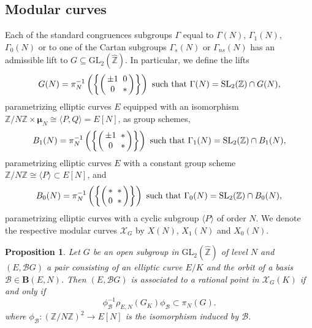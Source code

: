 \documentclass{amsart}
\newcommand{\cB}{\mathcal{B}}
\newcommand{\BB}{\mathbf{B}}
\newcommand{\cX}{\mathcal{X}}
\newcommand{\ZZ}{\mathbb{Z}}
\newcommand{\ZZhat}{\widehat{\ZZ}}
\newcommand{\XC}{\mathcal{X}}
\newcommand{\GL}{\mathrm{GL}}
\newcommand{\SL}{\mathrm{SL}}
\newcommand{\isom}{\cong}
\newcommand{\Group}{G}
\newcommand{\mmu}{\boldsymbol{\mu}}
\newtheorem{proposition}[theorem]{Proposition}
\begin{document}
\subsection*{Modular curves}
\mbox{}
Each of the standard congruences subgroups $\Gamma$ equal to $\Gamma(N)$, $\Gamma_1(N)$, $\Gamma_0(N)$
or to one of the Cartan subgroups $\Gamma_s(N)$ or $\Gamma_{ns}(N)$ has an admissible lift to
$G \subseteq \GL_2(\ZZhat)$.  In particular, we define the lifts
$$
G(N)   = \pi_N^{-1}\left(\left\{\left(\begin{array}{@{\,}c@{\;\;}c@{\,}} \pm1 & 0 \\ 0 & {*} \end{array}\right)\right\}\right)
\mbox{ such that } \Gamma(N) = \SL_2(\ZZ) \cap G(N),
$$
parametrizing elliptic curves $E$ equipped with an isomorphism $\ZZ/N\ZZ \times \mmu_N \isom
\langle{P,Q}\rangle = E[N]$, as group schemes,
$$
B_1(N) = \pi_N^{-1}\left(\left\{\left(\begin{array}{@{\,}c@{\;\;}c@{\,}} \pm1 & {*} \\ 0 & {*} \end{array}\right)\right\}\right)
\mbox{ such that } \Gamma_1(N) = \SL_2(\ZZ) \cap B_1(N),
$$
parametrizing elliptic curves $E$ with a constant group scheme $\ZZ/N\ZZ \isom \langle{P}\rangle \subset E[N]$, and
$$
B_0(N) = \pi_N^{-1}\left(\left\{\left(\begin{array}{@{\,}c@{\;\;}c@{\,}} {*} & {*} \\ 0 & {*} \end{array}\right)\right\}\right)
\mbox{ such that } \Gamma_0(N) = \SL_2(\ZZ) \cap B_0(N),
$$
parametrizing elliptic curves with a cyclic subgroup $\langle{P}\rangle$ of order $N$.
We denote the respective modular curves $\XC_G$ by $X(N)$, $X_1(N)$ and $X_0(N)$.

\begin{proposition}
  Let $\Group$ be an open subgroup in $\GL_2(\ZZhat)$ of level $N$ and
  $(E,\cB\Group)$ a pair consisting of an elliptic curve $E/K$ and the
  orbit of a basis $\cB \in \BB(E,N)$.
  Then $(E,\cB\Group)$ is associated to a rational point
  in $\cX_G(K)$ if and only if
  $$
  \phi_\cB^{-1}\rho_{E,N}(G_K)\phi_\cB \subset \pi_N(G).
  $$
  where $\phi_\cB: (\ZZ/N\ZZ)^2 \to E[N]$ is the isomorphism induced by $\cB$.
\end{proposition}
\end{document}
